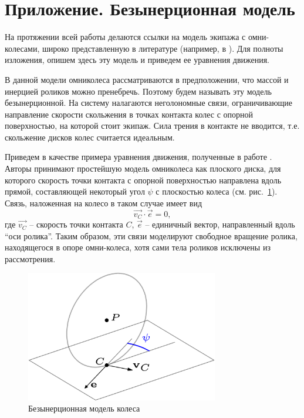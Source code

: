 \section{Приложение. Безынерционная модель}\label{sect:bezinerz}

На протяжении всей работы делаются ссылки на модель экипажа с омни-колесами, широко представленную в литературе (например, в \cite{Borisov2011, formalskii, ZobovaTatarinovPMM}). Для полноты изложения, опишем здесь эту модель и приведем ее уравнения движения.

В данной модели омниколеса рассматриваются в предположении, что массой и инерцией роликов можно пренебречь. Поэтому будем называть эту модель безынерционной. На систему налагаются неголономные связи, ограничивающие направление скорости скольжения в точках контакта колес с опорной поверхностью, на которой стоит экипаж. Сила трения в контакте не вводится, т.е. скольжение дисков колес считается идеальным.

Приведем в качестве примера уравнения движения, полученные в работе \cite{Borisov2011}. Авторы принимают простейшую модель омниколеса как плоского диска, для которого скорость точки контакта с опорной поверхностью направлена вдоль прямой, составляющей некоторый угол $\psi$ с плоскостью колеса (см. рис.~\ref{fig:bor_wheel_scheme}). Связь, наложенная на колесо в таком случае имеет вид
$$
    \vec{v_C} \cdot \vec{e} = 0,
$$
где $\vec{v_C}$ -- скорость точки контакта $C$, $\vec{e}$ -- единичный вектор, направленный вдоль ``оси ролика''. Таким образом, эти связи моделируют свободное вращение ролика, находящегося в опоре омни-колеса, хотя сами тела роликов исключены из рассмотрения.\\

\begin{figure}[ht!]
    \centering
    \includegraphics[width=0.75\textwidth]{content/pic/asy/wheel_bor.png}
    \caption{Безынерционная модель колеса}
    \label{fig:bor_wheel_scheme}
\end{figure}

